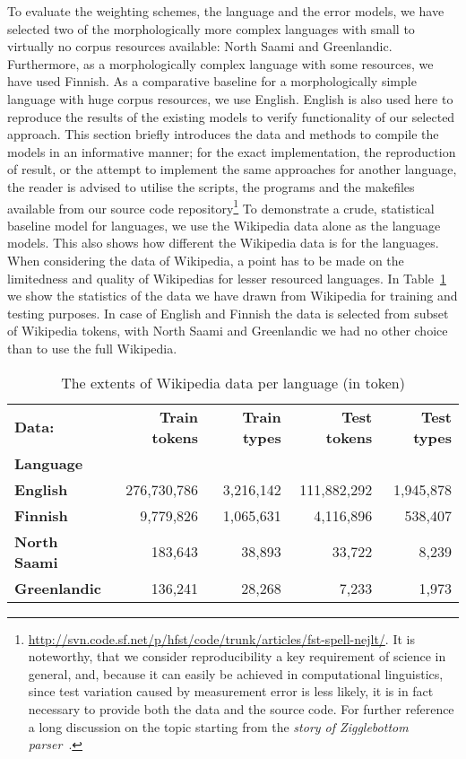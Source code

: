 \documentclass[a4paper,12pt]{article}
\begin{document}
To evaluate the weighting schemes, the language and the error models, we have
selected two of the morphologically more complex languages with small to
virtually no corpus resources available: North Saami and Greenlandic.
Furthermore, as a morphologically complex language with some resources, we have
used Finnish.  As a comparative baseline for a morphologically simple language
with huge corpus resources, we use English. English is also used here to
reproduce the results of the existing models to verify functionality of our
selected approach. This section briefly introduces the data and methods to
compile the models in an informative manner; for the exact implementation, the
reproduction of result, or the attempt to implement the same approaches for
another language, the reader is advised to utilise the scripts, the programs
and the makefiles available from our source code
repository\footnote{\url{http://svn.code.sf.net/p/hfst/code/trunk/articles/fst-spell-nejlt/}.
    It is noteworthy, that we consider reproducibility a key requirement of
    science in general, and, because it can easily be achieved in computational
    linguistics, since test variation caused by measurement error is less
    likely, it is in fact necessary to provide both the data and the source
    code.  For further reference a long discussion on the topic starting from
the \emph{story of Zigglebottom
parser}~\cite[]{pedersen2008empiricism,fokkensoffspring}.} To demonstrate a
crude, statistical baseline model for languages, we use the Wikipedia data
alone as the language models. This also shows how different the Wikipedia data
is for the languages.  When considering the data of Wikipedia, a point has to
be made on the limitedness and quality of Wikipedias for lesser resourced
languages. In Table~\ref{table:wikipedia-data} we show the statistics of the
data we have drawn from Wikipedia for training and testing purposes. In case of
English and Finnish the data is selected from subset of Wikipedia tokens, with
North Saami and Greenlandic we had no other choice than to use the full
Wikipedia.

\begin{table}
    \centering
    \begin{tabular}{|l|r|r|r|r|}
        \hline
        \bf Data:       & \bf Train tokens & \bf Train types & \bf Test tokens & \bf Test types \\
        \bf Language    &             &           &             &  \\
        \hline
        \bf English     & 276,730,786 & 3,216,142 & 111,882,292 & 1,945,878 \\
        \hline
        \bf Finnish     & 9,779,826   & 1,065,631 & 4,116,896   & 538,407 \\
        \hline
        \bf North Saami & 183,643     & 38,893    & 33,722      & 8,239 \\
        \hline
        \bf Greenlandic & 136,241     & 28,268    & 7,233       & 1,973 \\
        \hline
    \end{tabular}
    \caption{The extents of Wikipedia data per language (in token)
    \label{table:wikipedia-data}}
\end{table}
\end{document}
